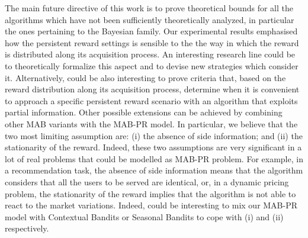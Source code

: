 The main future directive of this work is to prove theoretical bounds for all the algorithms which have not been sufficiently theoretically analyzed, in particular the ones pertaining to the Bayesian family. Our experimental results emphasised how the persistent reward settings is sensible to the the way in which the reward is distributed along its acquisition process. An interesting research line could be to theoretically formalize this aspect and to devise new strategies which consider it. Alternatively, could be also interesting to prove criteria that, based on the reward distribution along its acquisition process, determine when it is convenient to approach a specific persistent reward scenario with an algorithm that exploits partial information. Other possible extensions can be achieved by combining other MAB variants with the MAB-PR model. In particular, we believe that the two most limiting assumption are: (i) the absence of side information; and (ii) the stationarity of the reward. Indeed, these two assumptions are very significant in a lot of real problems that could be modelled as MAB-PR problem. For example, in a recommendation task, the absence of side information means that the algorithm considers that all the users to be served are identical, or, in a dynamic pricing problem, the stationarity of the reward implies that the algorithm is not able to react to the market variations. Indeed, could be interesting to mix our MAB-PR model with Contextual Bandits \citep{contextual} or Seasonal Bandits \citep{di2020linear} to cope with (i) and (ii) respectively.



